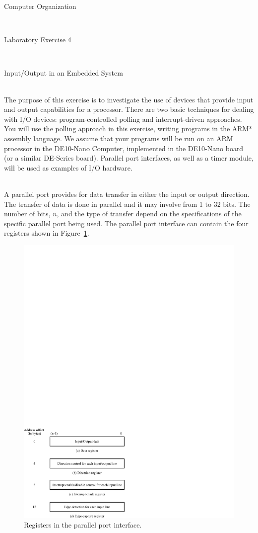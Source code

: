 \documentclass[epsfig,10pt,fullpage]{article}
\newcommand{\LabNum}{4}
\begin{document}
\centerline{\huge Computer Organization}
~\\
\centerline{\huge Laboratory Exercise \LabNum}
~\\
\centerline{\large Input/Output in an Embedded System}
~\\

\noindent
The purpose of this exercise is to investigate the use of devices that provide input and
output capabilities for a processor. There are two basic techniques for dealing with I/O devices:
program-controlled polling and interrupt-driven approaches.  You will use the polling approach 
in this exercise, writing programs in the ARM* assembly language.  We assume that your programs 
will be run on an ARM processor in the DE10-Nano Computer, implemented in the DE10-Nano
board (or a similar DE-Series board).  Parallel port interfaces, as well as a timer module, 
will be used as examples of I/O hardware.

~\\
\noindent
A parallel port provides for data transfer in either the input or output direction.  The 
transfer of data is done in parallel and it may involve from 1 to 32 bits. The number of
bits, $n$, and the type of transfer depend on the specifications of the specific parallel port 
being used.  The parallel port interface can contain the four registers shown in
Figure~\ref{fig:parallel}.

\begin{figure}[htb]
	\begin{center}
	\includegraphics[scale=1]{figures/figureparallel.pdf}
	\end{center}
	\caption{Registers in the parallel port interface.}
\label{fig:parallel}
\end{figure}
\end{document}
